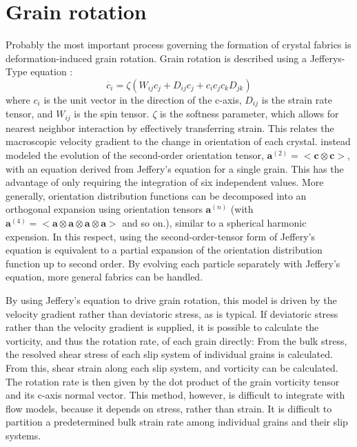 \documentclass{igs}
\begin{document}
\section{Grain rotation}
Probably the most important process governing the formation of crystal fabrics is deformation-induced grain rotation. Grain rotation is described using a Jefferys-Type equation \citep{azuma94}:
\begin{equation}
   \dot{c_i} = \zeta \left( W_{ij}  c_j + D_{ij} c_j + c_i c_j c_k D_{jk} \right)
\end{equation}
where $c_i$ is the unit vector in the direction of the c-axis, $D_{ij}$ is the strain rate tensor, and $W_{ij}$ is the spin tensor. $\zeta$ is the softness parameter, which allows for nearest neighbor interaction by effectively transferring strain. This relates the macroscopic velocity gradient to the change in orientation of each crystal. \citet{gillet2005} instead modeled the evolution of the  second-order orientation tensor, $\boldsymbol{a}^{(2)} = <\boldsymbol{c} \otimes \boldsymbol{c}>$, with an equation derived from Jeffery's equation for a single grain. This has the advantage of only requiring the integration of six independent values. More generally, orientation distribution functions can be decomposed into an orthogonal expansion using orientation tensors $\boldsymbol{a}^{(n)}$ (with $\boldsymbol{a}^{(4)} = < \boldsymbol{a} \otimes \boldsymbol{a} \otimes \boldsymbol{a} \otimes \boldsymbol{a}>$ and so on.), similar to a spherical harmonic expension. In this respect, using the second-order-tensor form of Jeffery's equation is equivalent to a partial expansion of the orientation distribution function up to second order. By evolving each particle separately with Jeffery's equation, more general fabrics can be handled.

By using Jeffery's equation to drive grain rotation, this model is driven by the velocity gradient rather than deviatoric stress, as is typical. If deviatoric stress rather than the velocity gradient is supplied, it is possible to calculate the vorticity, and thus the rotation rate, of each grain directly: From the bulk stress, the resolved shear stress of each slip system of individual grains is calculated. From this, shear strain along each slip system, and vorticity can be calculated. The rotation rate is then given by the dot product of the grain vorticity tensor and its c-axis normal vector. This method, however, is difficult to integrate with flow models, because it depends on stress, rather than strain. It is difficult to partition a predetermined bulk strain rate among individual grains and their slip systems.
\end{document}
